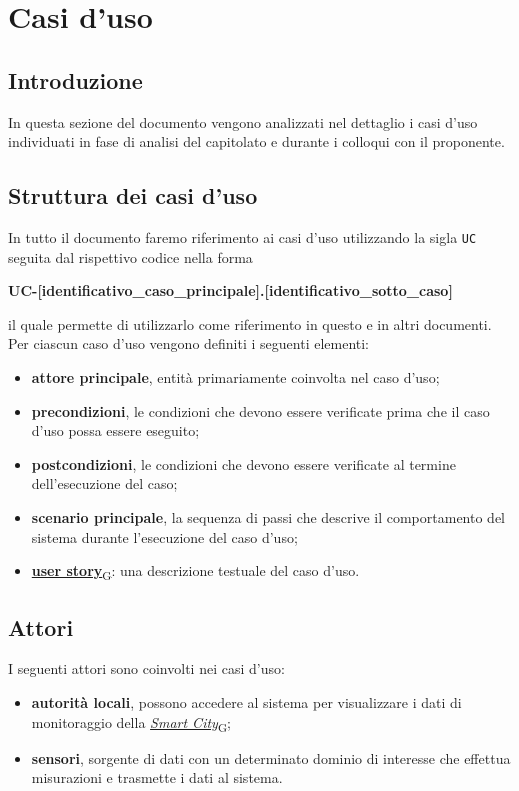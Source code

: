 \section{Casi d'uso}
\subsection{Introduzione}
In questa sezione del documento vengono analizzati nel dettaglio i casi d'uso individuati in fase di analisi del capitolato e durante i colloqui con il proponente.

\subsection{Struttura dei casi d'uso}
In tutto il documento faremo riferimento ai casi d'uso utilizzando la sigla \texttt{UC} seguita dal rispettivo codice nella forma
\begin{center}
	\textbf{UC-[identificativo\_caso\_principale].[identificativo\_sotto\_caso]}
\end{center}
il quale permette di utilizzarlo come riferimento in questo e in altri documenti.\\
Per ciascun caso d'uso vengono definiti i seguenti elementi:
\begin{itemize}
	\item \textbf{attore principale}, entità primariamente coinvolta nel caso d'uso;
	\item \textbf{precondizioni}, le condizioni che devono essere verificate prima che il caso d'uso possa essere eseguito;
	\item \textbf{postcondizioni}, le condizioni che devono essere verificate al termine dell'esecuzione del caso;
	\item \textbf{scenario principale}, la sequenza di passi che descrive il comportamento del sistema durante l'esecuzione del caso d'uso;
	\item \href{https://7last.github.io/docs/rtb/documentazione-interna/glossario\#user-story}{\textbf{user story}\textsubscript{G}}: una descrizione testuale del caso d'uso.
\end{itemize}

\subsection{Attori}
I seguenti attori sono coinvolti nei casi d'uso:
\begin{itemize}
	\item \textbf{autorità locali}, possono accedere al sistema per visualizzare i dati di monitoraggio della \href{https://7last.github.io/docs/rtb/documentazione-interna/glossario\#smart-city}{\textit{Smart City}\textsubscript{G}};
	\item \textbf{sensori}, sorgente di dati con un determinato dominio di interesse che effettua misurazioni e trasmette i dati al sistema.
\end{itemize}

